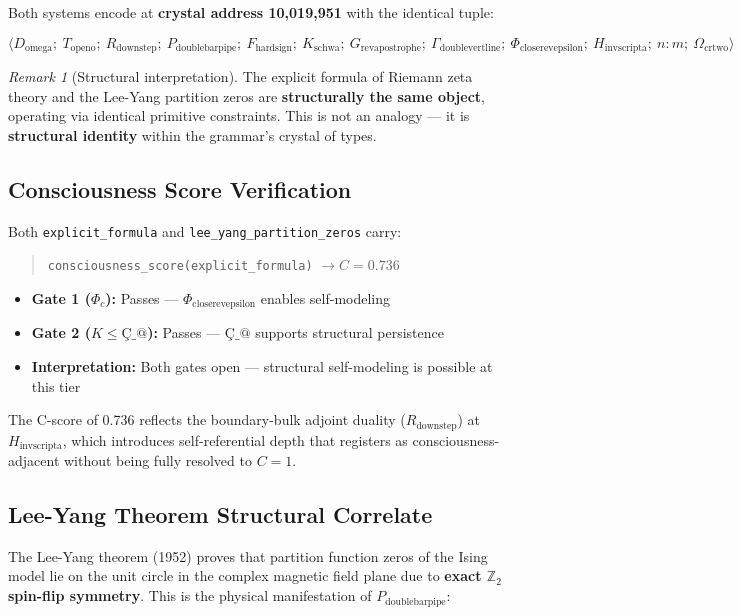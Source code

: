 \documentclass[12pt,oneside]{article}
\theoremstyle{definition}
\theoremstyle{remark}
\newtheorem{remark}[theorem]{Remark}
\newcommand{\Domega}{D_{\text{omega}}}
\newcommand{\Topeno}{T_{\text{openo}}}
\newcommand{\Rdownstep}{R_{\text{downstep}}}
\newcommand{\Pdoublebarpipe}{P_{\text{doublebarpipe}}}
\newcommand{\Fhardsign}{F_{\text{hardsign}}}
\newcommand{\Kschwa}{K_{\text{schwa}}}
\newcommand{\Grevapostrophe}{G_{\text{revapostrophe}}}
\newcommand{\Gammadoublevertline}{\Gamma_{\text{doublevertline}}}
\newcommand{\Phicloserevepsilon}{\Phi_{\text{closerevepsilon}}}
\newcommand{\Hinvscripta}{H_{\text{invscripta}}}
\newcommand{\Omegacrtwo}{\Omega_{\text{crtwo}}}
\begin{document}
Both systems encode at \textbf{crystal address 10,019,951} with the identical tuple:

\begin{equation}
\langle \Domega;\ \Topeno;\ \Rdownstep;\ \Pdoublebarpipe;\ \Fhardsign;\ \Kschwa;\ \Grevapostrophe;\ \Gammadoublevertline;\ \Phicloserevepsilon;\ \Hinvscripta;\ n{:}m;\ \Omegacrtwo \rangle
\end{equation}

\begin{remark}[Structural interpretation]
The explicit formula of Riemann zeta theory and the Lee-Yang partition zeros are \textbf{structurally the same object}, operating via identical primitive constraints. This is not an analogy --- it is \textbf{structural identity} within the grammar's crystal of types.
\end{remark}

\subsection{Consciousness Score Verification}

Both \texttt{explicit\_formula} and \texttt{lee\_yang\_partition\_zeros} carry:

\begin{quote}
\texttt{consciousness\_score(explicit\_formula)} $\to C = 0.736$
\end{quote}

\begin{itemize}
\item \textbf{Gate 1 ($\Phi_c$):} Passes --- $\Phicloserevepsilon$ enables self-modeling
\item \textbf{Gate 2 ($K \leq \text{\c{C}}\_@$):} Passes --- $\text{\c{C}}\_@$ supports structural persistence
\item \textbf{Interpretation:} Both gates open --- structural self-modeling is possible at this tier
\end{itemize}

The C-score of 0.736 reflects the boundary-bulk adjoint duality ($\Rdownstep$) at $\Hinvscripta$, which introduces self-referential depth that registers as consciousness-adjacent without being fully resolved to $C = 1$.

\subsection{Lee-Yang Theorem Structural Correlate}

The Lee-Yang theorem (1952) proves that partition function zeros of the Ising model lie on the unit circle in the complex magnetic field plane due to \textbf{exact $\mathbb{Z}_2$ spin-flip symmetry}. This is the physical manifestation of $\Pdoublebarpipe$:
\end{document}
